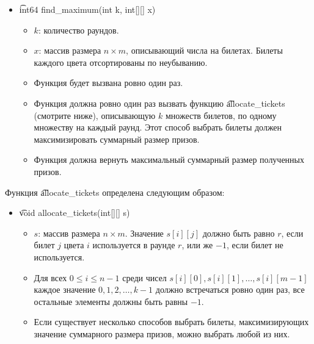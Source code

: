 \begin{itemize}
\item \t{int64 find\_maximum(int k, int[][] x)}
\begin{itemize}

\item $k$: количество раундов.
\item $x$: массив размера $n\times m$, описывающий числа на билетах. Билеты каждого цвета отсортированы по неубыванию. 
\item Функция будет вызвана ровно один раз.
\item Функция должна ровно один раз вызвать функцию  \t{allocate\_tickets} (смотрите ниже), описывающую $k$ множеств билетов, по одному множеству на каждый раунд. Этот способ выбрать билеты должен максимизировать суммарный размер призов. 
\item Функция должна вернуть максимальный суммарный размер полученных призов. 
\end{itemize}
\end{itemize}

Функция \t{allocate\_tickets} определена следующим образом:

\begin{itemize}
\item \t{void allocate\_tickets(int[][] s)}
\begin{itemize}
\item $s$: массив размера $n\times m$. Значение $s[i][j]$ должно быть равно $r$, если билет $j$ цвета $i$ используется в раунде $r$, или же $-1$, если билет не используется.
\item Для всех $0 \leq i \leq n - 1$ среди чисел $s[i][0], s[i][1],\ldots, s[i][m - 1]$ каждое значение $0,1,2,\ldots,k-1$ должно встречаться ровно один раз, все остальные элементы должны быть равны $-1$.
\item Если существует несколько способов выбрать билеты, максимизирующих значение суммарного размера призов, можно выбрать любой из них. 
\end{itemize}
\end{itemize}

